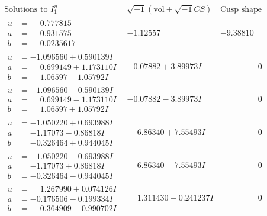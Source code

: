 \documentclass[1p]{elsarticle_modified}
\theoremstyle{definition}
\newcommand{\I}{\sqrt{-1}}
\begin{document}
$$\begin{array}{c|c|c}
\text{Solutions to }I^u_{1}& \I (\text{vol} + \sqrt{-1}CS) & \text{Cusp shape}\\
 \hline 
\begin{aligned}
u &= \phantom{-}0.777815\phantom{ +0.000000I} \\
a &= \phantom{-}0.931575\phantom{ +0.000000I} \\
b &= \phantom{-}0.0235617\phantom{ +0.000000I}\end{aligned}
 & -1.12557\phantom{ +0.000000I} & -9.38810\phantom{ +0.000000I} \\ \hline\begin{aligned}
u &= -1.096560 + 0.590139 I \\
a &= \phantom{-}0.699149 + 1.173110 I \\
b &= \phantom{-}1.06597 - 1.05792 I\end{aligned}
 & -0.07882 + 3.89973 I & \phantom{-0.000000 } 0 \\ \hline\begin{aligned}
u &= -1.096560 - 0.590139 I \\
a &= \phantom{-}0.699149 - 1.173110 I \\
b &= \phantom{-}1.06597 + 1.05792 I\end{aligned}
 & -0.07882 - 3.89973 I & \phantom{-0.000000 } 0 \\ \hline\begin{aligned}
u &= -1.050220 + 0.693988 I \\
a &= -1.17073 - 0.86818 I \\
b &= -0.326464 + 0.944045 I\end{aligned}
 & \phantom{-}6.86340 + 7.55493 I & \phantom{-0.000000 } 0 \\ \hline\begin{aligned}
u &= -1.050220 - 0.693988 I \\
a &= -1.17073 + 0.86818 I \\
b &= -0.326464 - 0.944045 I\end{aligned}
 & \phantom{-}6.86340 - 7.55493 I & \phantom{-0.000000 } 0 \\ \hline\begin{aligned}
u &= \phantom{-}1.267990 + 0.074126 I \\
a &= -0.176506 - 0.199334 I \\
b &= \phantom{-}0.364909 - 0.990702 I\end{aligned}
 & \phantom{-}1.311430 - 0.241237 I & \phantom{-0.000000 } 0 \\ \hline\begin{aligned}

\end{aligned}
\end{array}$$
\end{document}
